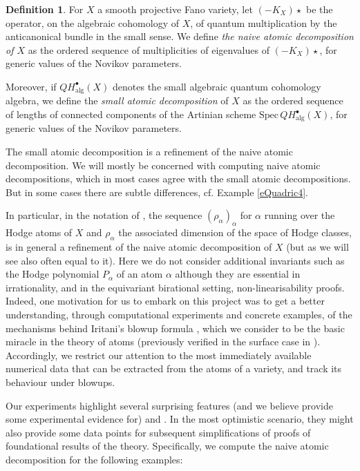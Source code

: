 \documentclass[11pt]{amsart}
\theoremstyle{plain}
\numberwithin{equation}{section}
\theoremstyle{definition}
\newtheorem{definition}[theorem]{Definition}
\theoremstyle{remark}
\begin{document}
\begin{definition}\label{dNaiveAtoms}
For $X$ a smooth projective Fano variety,  
let $(-K_X)\star$ be the operator, on the algebraic cohomology of $X$, of quantum multiplication by the anticanonical bundle in the small sense. 
We define \emph{the naive atomic decomposition of $X$} as the ordered sequence of multiplicities of eigenvalues of $(-K_X)\star$, for generic values of the Novikov parameters. 

 Moreover, if $QH^{\bullet}_{\mathrm{alg}} (X)$ denotes the small algebraic quantum cohomology algebra, we define the \emph{small atomic decomposition} of $X$ as the ordered sequence of lengths of connected components of the Artinian scheme  $\mathrm{Spec}\, QH^{\bullet}_{\mathrm{alg}} (X)$, for generic values of the Novikov parameters. 
\end{definition}

The small atomic decomposition is a refinement of the naive atomic decomposition. 
We will mostly be concerned with computing naive atomic decompositions, which in most cases agree with the small atomic decompositions. But in some cases there are subtle differences, cf. Example \ref{eQuadric4}. 

In particular, in the notation of \cite{KKPY25}, the sequence $(\rho_{\alpha})_{\alpha}$ for $\alpha$ running over the Hodge atoms of $X$ and $\rho_{\alpha}$ the associated dimension of the space of Hodge classes, is in general a refinement of the naive atomic decomposition of $X$ (but as we will see also often equal to it). Here we do not consider additional invariants such as the Hodge polynomial $P_{\alpha}$ of an atom $\alpha$ although they are essential in irrationality, and in the equivariant birational setting, non-linearisability proofs. Indeed, one motivation for us to embark on this project was to get a better understanding, through computational experiments and concrete examples, of the mechanisms behind Iritani's blowup formula \cite{Iritani23}, which we consider to be the basic miracle in the theory of atoms (previously verified in the surface case in \cite{GS25}). Accordingly, we restrict our attention to the most immediately available numerical data that can be extracted from the atoms of a variety, and track its behaviour under blowups.

\medskip


Our experiments highlight several surprising features (and we believe provide some experimental evidence for) \cite{Iritani23} and \cite{KKPY25}. In the most optimistic scenario, they might also provide some data points for subsequent simplifications of proofs of foundational results of the theory. Specifically, we compute the naive atomic decomposition for the following examples:
\end{document}
